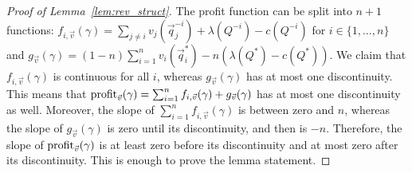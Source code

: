 \begin{proof}[Proof of Lemma~\ref{lem:rev_struct}]
The profit function can be split into $n+1$ functions:
$f_{i,\vec{v}}(\gamma) = \sum_{j \not= i} v_j\left(\vec{q}^{-i}_j\right) + \lambda\left(Q^{-i}\right) - c\left(Q^{-i}\right)$ for $i \in \{1, \dots, n\}$ and $g_{\vec{v}}(\gamma) = (1 - n)\sum_{i = 1}^n v_i\left(\vec{q}_i^*\right) - n\left(\lambda\left(Q^*\right) - c\left(Q^*\right)\right).$ We claim that $f_{i,\vec{v}}(\gamma)$ is continuous for all $i$, whereas $g_{\vec{v}}(\gamma)$ has at most one discontinuity. This means that ${\normalfont \textnormal{profit}}_{\vec{v}}(\gamma) = \sum_{i = 1}^n f_{i,\vec{v}}(\gamma) + g_{\vec{v}}(\gamma)$ has at most one discontinuity as well. Moreover, the slope of $\sum_{i = 1}^n f_{i,\vec{v}}(\gamma)$ is between zero and $n$, whereas the slope of $g_{\vec{v}}(\gamma)$ is zero until its discontinuity, and then is $-n$. Therefore, the slope of ${\normalfont \textnormal{profit}}_{\vec{v}}(\gamma)$ is at least zero before its discontinuity and at most zero after its discontinuity. This is enough to prove the lemma statement.


\end{proof}
